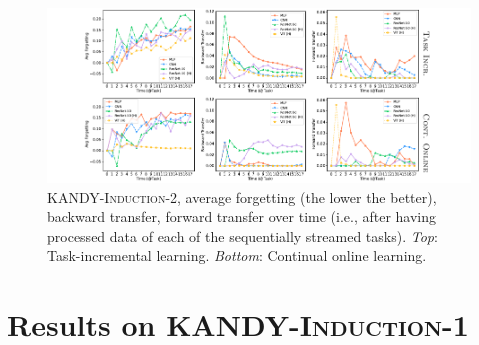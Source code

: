 \begin{figure}

	\centering
	\includegraphics[width=1.0\textwidth]{imgs/kandy/Fig11.pdf}
	\caption[Average forgetting over time on \textsc{KANDY-Induction-2}]{\textsc{KANDY-Induction-2}, average forgetting (the lower the better), backward transfer, forward transfer over time (i.e., after having processed data of each of the sequentially streamed tasks). {\it Top}: Task-incremental learning. {\it Bottom}: Continual online learning.}
	\label{kandy:fig:time_hard}
\end{figure}

\section{Results on \textsc{KANDY-Induction-1}}
